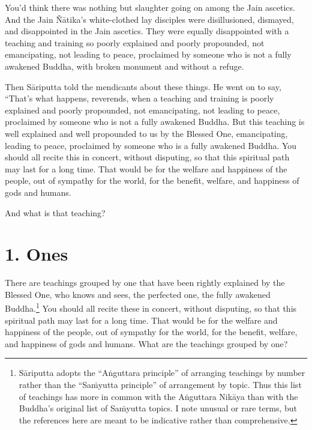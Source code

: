 \documentclass[12pt,openany]{book}%
\begin{document}
You’d think there was nothing but slaughter going on among the Jain ascetics. And the Jain \textsanskrit{Ñātika}’s white-clothed lay disciples were disillusioned, dismayed, and disappointed in the Jain ascetics. They were equally disappointed with a teaching and training so poorly explained and poorly propounded, not emancipating, not leading to peace, proclaimed by someone who is not a fully awakened Buddha, with broken monument and without a refuge. 

Then \textsanskrit{Sāriputta} told the mendicants about these things. He went on to say, “That’s what happens, reverends, when a teaching and training is poorly explained and poorly propounded, not emancipating, not leading to peace, proclaimed by someone who is not a fully awakened Buddha. But this teaching is well explained and well propounded to us by the Blessed One, emancipating, leading to peace, proclaimed by someone who is a fully awakened Buddha. You should all recite this in concert, without disputing, so that this spiritual path may last for a long time. That would be for the welfare and happiness of the people, out of sympathy for the world, for the benefit, welfare, and happiness of gods and humans. 

And what is that teaching? 

\section*{1. Ones }

There are teachings grouped by one that have been rightly explained by the Blessed One, who knows and sees, the perfected one, the fully awakened Buddha.\footnote{\textsanskrit{Sāriputta} adopts the “\textsanskrit{Aṅguttara} principle” of arranging teachings by number rather than the “\textsanskrit{Saṁyutta} principle” of arrangement by topic. Thus this list of teachings has more in common with the \textsanskrit{Aṅguttara} \textsanskrit{Nikāya} than with the Buddha’s original list of \textsanskrit{Saṁyutta} topics. I note unusual or rare terms, but the references here are meant to be indicative rather than comprehensive. } You should all recite these in concert, without disputing, so that this spiritual path may last for a long time. That would be for the welfare and happiness of the people, out of sympathy for the world, for the benefit, welfare, and happiness of gods and humans. What are the teachings grouped by one? 
\end{document}

